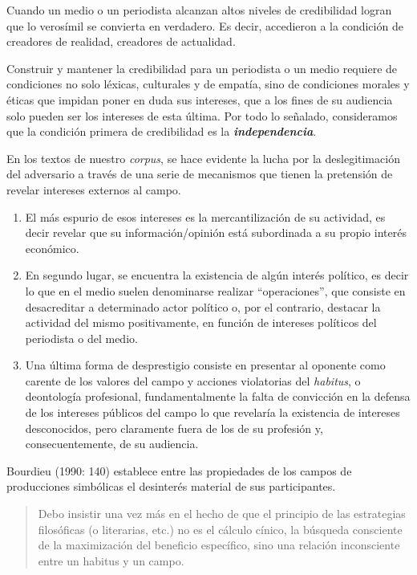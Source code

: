 Cuando un medio o un periodista alcanzan altos niveles de credibilidad logran que lo verosímil se convierta en verdadero. Es decir, accedieron a la condición de creadores de realidad, creadores de actualidad.

Construir y mantener la credibilidad para un periodista o un medio requiere de condiciones no solo léxicas, culturales y de empatía, sino de condiciones morales y éticas que impidan poner en duda sus intereses, que a los fines de su audiencia solo pueden ser los intereses de esta última. Por todo lo señalado, consideramos que la condición primera de credibilidad es la \textbf{\emph{independencia}}.

En los textos de nuestro \emph{corpus}, se hace evidente la lucha por la deslegitimación del adversario a través de una serie de mecanismos que tienen la pretensión de revelar intereses externos al campo.

\begin{enumerate} [label=\alph*.]
\item El más espurio de esos intereses es la mercantilización de su actividad, es decir revelar que su información/opinión está subordinada a su propio interés económico.
\item En segundo lugar, se encuentra la existencia de algún interés político, es decir lo que en el medio suelen denominarse realizar ``operaciones'', que consiste en desacreditar a determinado actor político o, por el contrario, destacar la actividad del mismo positivamente, en función de intereses políticos del periodista o del medio.
\item Una última forma de desprestigio consiste en presentar al oponente como carente de los valores del campo y acciones violatorias del \emph{habitus}, o deontología profesional, fundamentalmente la falta de convicción en la defensa de los intereses públicos del campo  lo que revelaría la existencia de intereses desconocidos, pero claramente fuera de los de su profesión y, consecuentemente, de su audiencia.
\end{enumerate}

Bourdieu (1990: 140) establece entre las propiedades de los campos de producciones simbólicas el desinterés material de sus participantes.

\begin{quote}
	Debo insistir una vez más en el hecho de que el principio de las estrategias filosóficas (o literarias, etc.) no es el cálculo cínico, la búsqueda consciente de la maximización del beneficio específico, sino una relación inconsciente entre un habitus y un campo.
\end{quote}

